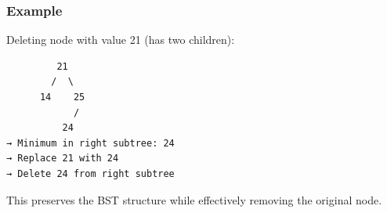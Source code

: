 \subsubsection*{Example}
Deleting node with value 21 (has two children):

\begin{verbatim}
         21
        /  \
      14    25
            /
          24
→ Minimum in right subtree: 24
→ Replace 21 with 24
→ Delete 24 from right subtree
\end{verbatim}

This preserves the BST structure while effectively removing the original node.
